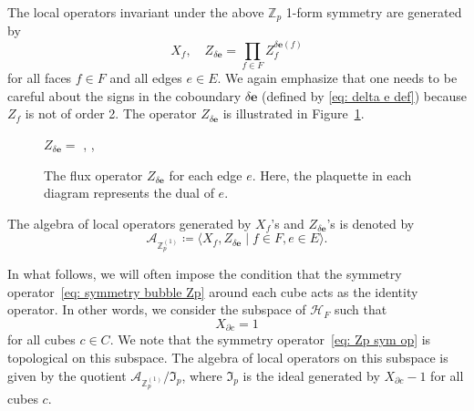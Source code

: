 \documentclass[aps,twocolumn,prx,floatfix,preprintnumbers, nofootinbib,10pt]{revtex4-2}
\numberwithin{equation}{section}
\theoremstyle{definition}
\theoremstyle{remark}
\theoremstyle{claim}
\begin{document}
The local operators invariant under the above $\mathbb{Z}_p$ 1-form symmetry are generated by
\begin{equation}
X_f, \quad
Z_{\delta \bm{e}} = \prod_{f \in F} Z_f^{\delta \bm{e}(f)}
\label{eq: XZ Zp}
\end{equation}
for all faces $f \in F$ and all edges $e \in E$.
We again emphasize that one needs to be careful about the signs in the coboundary $\delta \bm{e}$ (defined by \eqref{eq: delta e def}) because $Z_f$ is not of order 2.
The operator $Z_{\delta \bm{e}}$ is illustrated in Figure~\ref{fig: Zp flux}.
\begin{figure}
\centering
$Z_{\delta \bm{e}} =$
,
,
\caption{The flux operator $Z_{\delta \bm{e}}$ for each edge $e$. Here, the plaquette in each diagram represents the dual of $e$.}
\label{fig: Zp flux}
\end{figure}
The algebra of local operators generated by $X_f$'s and $Z_{\delta \bm{e}}$'s is denoted by
\begin{equation}
\mathcal{A}_{\mathbb{Z}_p^{(1)}} \coloneq \langle X_f, Z_{\delta \bm{e}} \mid f \in F, e \in E \rangle.
\end{equation}

In what follows, we will often impose the condition that the symmetry operator~\eqref{eq: symmetry bubble Zp} around each cube acts as the identity operator.
In other words, we consider the subspace of $\mathcal{H}_F$ such that
\begin{equation}
X_{\partial c} = 1
\end{equation}
for all cubes $c \in C$.
We note that the symmetry operator~\eqref{eq: Zp sym op} is topological on this subspace.
The algebra of local operators on this subspace is given by the quotient $\mathcal{A}_{\mathbb{Z}_p^{(1)}} / \mathfrak{I}_p$, where $\mathfrak{I}_p$ is the ideal generated by $X_{\partial c} -1$ for all cubes $c$.
\end{document}
